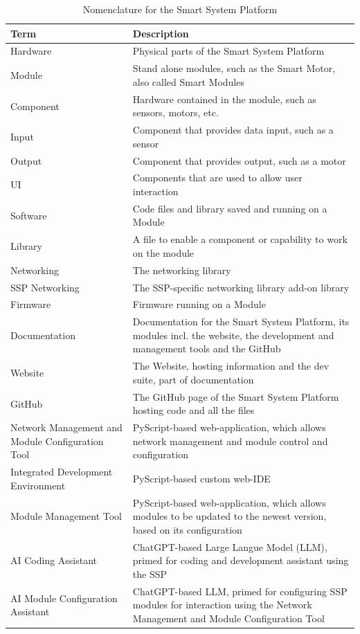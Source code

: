 \begin{table}[H]
    \centering
    \begin{tabular}{|p{125pt}|p{325pt}|}
    \hline
        \textbf{Term} & \textbf{Description} \\\hline
        Hardware        & Physical parts of the Smart System Platform \\\hline
        Module          & Stand alone modules, such as the Smart Motor, also called Smart Modules \\\hline
        Component       & Hardware contained in the module, such as sensors, motors, etc. \\\hline
        Input           & Component that provides data input, such as a sensor \\\hline
        Output          & Component that provides output, such as a motor \\\hline
        UI              & Components that are used to allow user interaction  \\\hline
        Software        & Code files and library saved and running on a Module \\\hline
        Library         & A file to enable a component or capability to work on the module \\\hline
        Networking      & The networking library \\\hline
        SSP Networking  & The SSP-specific networking library add-on library\\\hline
        Firmware        & Firmware running on a Module \\\hline
        Documentation   & Documentation for the Smart System Platform, its modules incl. the website, the development and management tools and the GitHub \\\hline
        Website         & The Website, hosting information and the dev suite, part of documentation \\\hline
        GitHub          & The GitHub page of the Smart System Platform hosting code and all the files \\\hline
        Network Management and Module Configuration Tool & PyScript-based web-application, which allows network management and module control and configuration \\\hline
        Integrated Development Environment & PyScript-based custom web-IDE \\\hline
        Module Management Tool & PyScript-based web-application, which allows modules to be updated to the newest version, based on its configuration \\\hline
        AI Coding Assistant   & ChatGPT-based Large Langue Model (LLM), primed for coding and development assistant using the SSP \\\hline
        AI Module Configuration Assistant & ChatGPT-based LLM, primed for configuring SSP modules for interaction using the Network Management and Module Configuration Tool \\\hline
    \end{tabular}
    \vspace{\ftspace}
    \caption{Nomenclature for the Smart System Platform}
    \label{tab:nomenclature}
\end{table}

